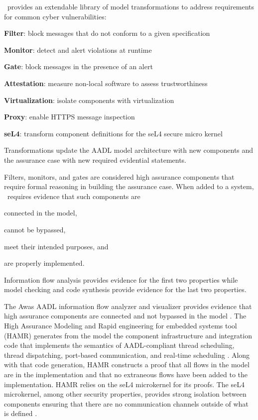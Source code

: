 \brfcs\ provides an extendable library of model transformations to address requirements for common cyber vulnerabilities:
\begin{compactitem}
	\item \textbf{Filter}: block messages that do not conform to a given specification
	\item \textbf{Monitor}: detect and alert violations at runtime
	\item \textbf{Gate}: block messages in the presence of an alert
	\item \textbf{Attestation}: measure non-local software to assess trustworthiness
	\item \textbf{Virtualization}: isolate components with virtualization
	\item \textbf{Proxy}: enable HTTPS message inspection 
	\item \textbf{seL4}: transform component definitions for the seL4 secure micro kernel
\end{compactitem}
Transformations update the AADL model architecture with new components and the assurance case with new required evidential statements.

Filters, monitors, and gates are considered high assurance components that require formal reasoning in building the assurance case.
When added to a system, \brfcs\ requires evidence that such components are 
\begin{compactenum}
	\item connected in the model, 
	\item cannot be bypassed, 
	\item meet their intended purposes, and
	\item are properly implemented.
\end{compactenum}
Information flow analysis provides evidence for the first two properties while model checking and code synthesis provide evidence for the last two properties.

The Awas AADL information flow analyzer and visualizer provides evidence that high assurance components are connected and not bypassed in the model \cite{awas}.
The High Assurance Modeling and Rapid engineering for embedded systems tool (HAMR) generates from the model the component infrastructure and integration code that implements the semantics of AADL-compliant thread scheduling, thread dispatching, port-based communication, and real-time scheduling \cite{hamr}.
Along with that code generation, HAMR constructs a proof that all flows in the model are in the implementation and that no extraneous flows have been added to the implementation.
HAMR relies on the seL4 microkernel for its proofs.
The seL4 microkernel, among other security properties, provides strong isolation between components ensuring that there are no communication channels outside of what is defined \cite{sel4-sosp09, sel4-tocs14, sel4-cacm18}.

